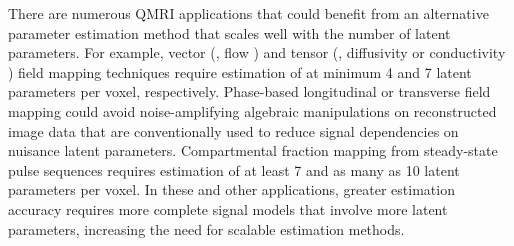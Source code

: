 There are numerous QMRI applications
that could benefit from an alternative parameter estimation method
that scales well with the number of latent parameters.
For example,
vector (\eg, flow \cite{feinberg:85:mri})
and tensor 
(\eg, diffusivity \cite{bihan:01:dti} or conductivity \cite{tuch:01:ctm})
field mapping techniques
require estimation 
of at minimum 4 and 7 latent parameters per voxel,
respectively.
Phase-based longitudinal \cite{sekihara:85:nif} 
or transverse \cite{morrell:08:aps,sacolick:10:bmb} field mapping
could avoid noise-amplifying algebraic manipulations
on reconstructed image data
that are conventionally used
to reduce signal dependencies 
on nuisance latent parameters.
Compartmental fraction mapping \cite{mackay:94:ivv,nataraj:17:mwf}
from steady-state pulse sequences
requires estimation of at least 7 \cite{deoni:08:gmt}
and as many as 10 \cite{deoni:13:oct}
latent parameters per voxel.
In these and other applications,
greater estimation accuracy
requires more complete signal models
that involve more latent parameters,
increasing the need 
for scalable estimation methods.

